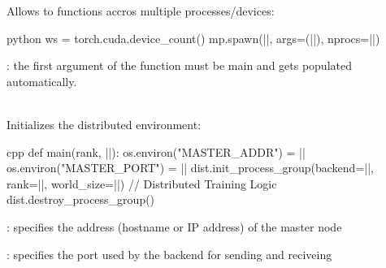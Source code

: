 \begin{defnbox}\nospacing
    \begin{defn}\label{defn:torch_multiprocessing}
        Allows to  functions accros multiple processes/devices:
        \begin{mintlinebox}{python}
           ws = torch.cuda.device_count()
           mp.spawn(|\texttt{}|, args=(|\texttt{}|), nprocs=|\texttt{}|)
        \end{mintlinebox}
        : the first argument of the function must be main and gets populated automatically.
    \end{defn}
\end{defnbox}
\begin{defnbox}\nospacing
    \begin{defn}\label{defn:torch_distributed}\leavevmode\\
        Initializes the distributed environment:
        \begin{mintlinebox}{cpp}
        def main(rank, |\texttt{}|):
            os.environ("MASTER_ADDR") = |\texttt{}|
            os.environ("MASTER_PORT") = |\texttt{}|
            dist.init_process_group(backend=|\texttt{}|,
                                    rank=|\texttt{}|,
                                    world_size=|\texttt{}|)
            // Distributed Training Logic
            dist.destroy_process_group()
        \end{mintlinebox}
        \begin{itemizenosep}
            \item {}: specifies the address (hostname or IP address) of the master node
            \item {}: specifies the port used by the backend for sending and reciveing
        \end{itemizenosep}
    \end{defn}
\end{defnbox}


